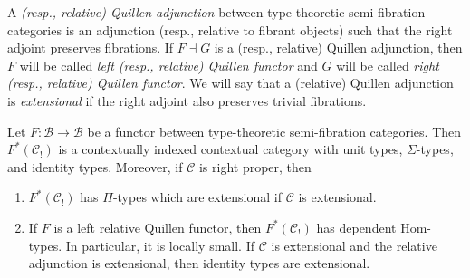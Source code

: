 \documentclass[reqno]{amsart}
\theoremstyle{definition}
\theoremstyle{remark}
\newcommand{\fs}[1]{\mathrm{#1}}
\newcommand{\scat}[1]{\mathcal{#1}}
\newcommand{\Hom}{\fs{Hom}}
\numberwithin{figure}{section}
\begin{document}
\begin{defn}
A \emph{(resp., relative) Quillen adjunction} between type-theoretic semi-fibration categories is an adjunction (resp., relative to fibrant objects) such that the right adjoint preserves fibrations.
If $F \dashv G$ is a (resp., relative) Quillen adjunction, then $F$ will be called \emph{left (resp., relative) Quillen functor} and $G$ will be called \emph{right (resp., relative) Quillen functor}.
We will say that a (relative) Quillen adjunction is \emph{extensional} if the right adjoint also preserves trivial fibrations.
\end{defn}

\begin{prop}
Let $F : \scat{B} \to \scat{B}$ be a functor between type-theoretic semi-fibration categories.
Then $F^*(\scat{C}_!)$ is a contextually indexed contextual category with unit types, $\Sigma$-types, and identity types.
Moreover, if $\scat{C}$ is right proper, then
\begin{enumerate}
\item $F^*(\scat{C}_!)$ has $\Pi$-types which are extensional if $\scat{C}$ is extensional.
\item If $F$ is a left relative Quillen functor, then $F^*(\scat{C}_!)$ has dependent $\Hom$-types.
In particular, it is locally small.
If $\scat{C}$ is extensional and the relative adjunction is extensional, then identity types are extensional.
\end{enumerate}
\end{prop}
\end{document}
